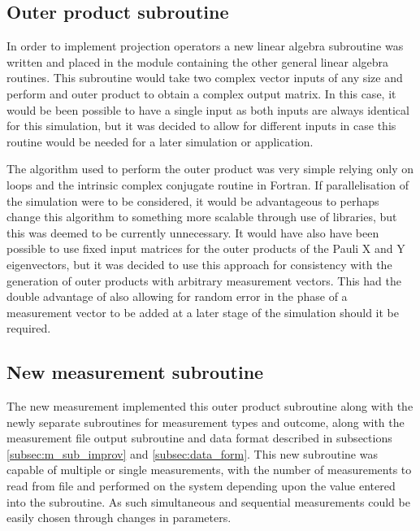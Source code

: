 \subsection{Outer product subroutine}

In order to implement projection operators a new linear algebra subroutine was written and placed in the module containing the other general linear algebra routines. This subroutine would take two complex vector inputs of any size and perform and outer product to obtain a complex output matrix. In this case, it would be been possible to have a single input as both inputs are always identical for this simulation, but it was decided to allow for different inputs in case this routine would be needed for a later simulation or application. 


The algorithm used to perform the outer product was very simple relying only on loops and the intrinsic complex conjugate routine in Fortran. If parallelisation of the simulation were to be considered, it would be advantageous to perhaps change this algorithm to something more scalable through use of libraries, but this was deemed to be currently unnecessary. It would have also have been possible to use fixed input matrices for the outer products of the Pauli X and Y eigenvectors, but it was decided to use this approach for consistency with the generation of outer products with arbitrary measurement vectors. This had the double advantage of also allowing for random error in the phase of a measurement vector to be added at a later stage of the simulation should it be required.  

\subsection{New measurement subroutine}

The new measurement implemented this outer product subroutine along with the newly separate subroutines for measurement types and outcome, along with the measurement file output subroutine and data format described in subsections \ref{subsec:m_sub_improv} and \ref{subsec:data_form}. This new subroutine was capable of multiple or single measurements, with the number of measurements to read from file and performed on the system depending upon the value entered into the subroutine. As such simultaneous and sequential measurements could be easily chosen through changes in parameters. 



